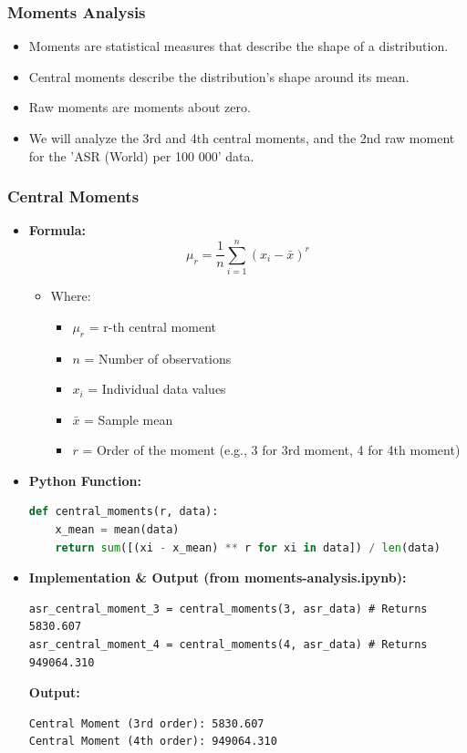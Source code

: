 \begin{frame}
    \frametitle{Moments Analysis}
    \begin{itemize}
        \item Moments are statistical measures that describe the shape of a distribution.
        \item Central moments describe the distribution's shape around its mean.
        \item Raw moments are moments about zero.
        \item We will analyze the 3rd and 4th central moments, and the 2nd raw moment for the 'ASR (World) per 100 000' data.
    \end{itemize}
\end{frame}

\begin{frame}[fragile]
    \frametitle{Central Moments}
    \begin{itemize}
        \item \textbf{Formula:}
        \[
        \mu_r = \frac{1}{n} \sum_{i=1}^{n} (x_i - \bar{x})^r
        \]
        \begin{itemize}
            \item Where:
            \begin{itemize}
                \item $\mu_r$ = r-th central moment
                \item $n$ = Number of observations
                \item $x_i$ = Individual data values
                \item $\bar{x}$ = Sample mean
                \item $r$ = Order of the moment (e.g., 3 for 3rd moment, 4 for 4th moment)
            \end{itemize}
        \end{itemize}

        \item \textbf{Python Function:}
        \begin{lstlisting}[language=Python]
def central_moments(r, data):
    x_mean = mean(data)
    return sum([(xi - x_mean) ** r for xi in data]) / len(data)
        \end{lstlisting}

        \item \textbf{Implementation \& Output (from moments-analysis.ipynb):}
        \begin{lstlisting}
asr_central_moment_3 = central_moments(3, asr_data) # Returns 5830.607
asr_central_moment_4 = central_moments(4, asr_data) # Returns 949064.310
        \end{lstlisting}
        \textbf{Output:}
        \begin{verbatim}
Central Moment (3rd order): 5830.607
Central Moment (4th order): 949064.310
        \end{verbatim}


\end{itemize}
\end{frame}
